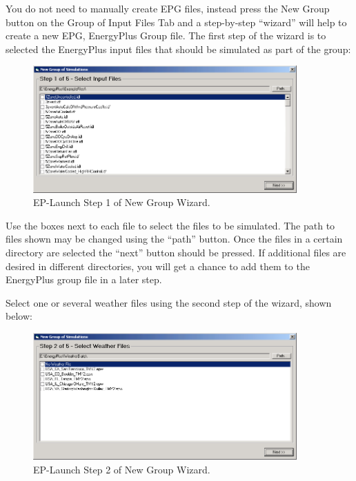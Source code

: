 You do not need to manually create EPG files, instead press the New Group button on the Group of Input Files Tab and a step-by-step ``wizard'' will help to create a new EPG, EnergyPlus Group file. The first step of the wizard is to selected the EnergyPlus input files that should be simulated as part of the group:

\begin{figure}[hbtp] %
\centering
\includegraphics[width=0.9\textwidth, height=0.9\textheight, keepaspectratio=true]{media/image108.png}
\caption{EP-Launch Step 1 of New Group Wizard. \protect \label{fig:ep-launch-step-1-of-new-group-wizard.}}
\end{figure}

Use the boxes next to each file to select the files to be simulated. The path to files shown may be changed using the ``path'' button. Once the files in a certain directory are selected the ``next'' button should be pressed. If additional files are desired in different directories, you will get a chance to add them to the EnergyPlus group file in a later step.

Select one or several weather files using the second step of the wizard, shown below:

\begin{figure}[hbtp] %
\centering
\includegraphics[width=0.9\textwidth, height=0.9\textheight, keepaspectratio=true]{media/image109.png}
\caption{EP-Launch Step 2 of New Group Wizard. \protect \label{fig:ep-launch-step-2-of-new-group-wizard.}}
\end{figure}

